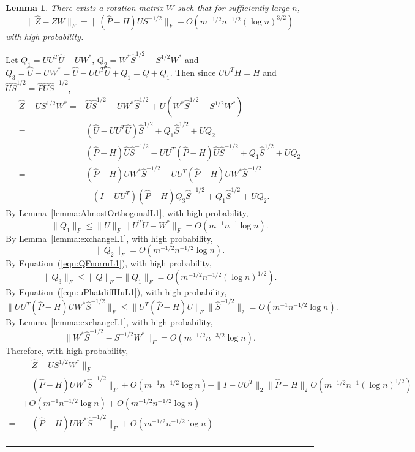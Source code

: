 \documentclass[a4paper]{article}
\newenvironment{proof}{{\bf Proof:  }}{\hfill\rule{2mm}{2mm}}
\newtheorem{lemma}[fact]{Lemma}
\renewcommand{\hat}{\widehat}
\begin{document}
\begin{lemma}
\label{lemma:XhatDiffXWexpressionL1}
There exists a rotation matrix $W$ such that for sufficiently large $n$,
\[
	\|\hat{Z} - Z W\|_F = \| (\hat{P} - H) U S^{-1/2} \|_F + O(m^{-1/2} n^{-1/2} (\log n)^{3/2})
\]
with high probability.
\end{lemma}
\begin{proof}
Let $Q_1 = U U^T \hat{U} - U W^*$, $Q_2 = W^* \hat{S}^{1/2} - S^{1/2} W^*$ and $Q_3 = \hat{U} - U W^* = \hat{U} - U U^T \hat{U} + Q_1 = Q + Q_1$. Then since $U U^T H = H$ and $\hat{U} \hat{S}^{1/2} = \hat{P} \hat{U} \hat{S}^{-1/2}$,
\begin{align*}
	\hat{Z} - U S^{1/2} W^*
    = & \hat{U} \hat{S}^{1/2} - U W^* \hat{S}^{1/2} + U(W^* \hat{S}^{1/2} - S^{1/2} W^*) \\
    = & (\hat{U} - U U^T \hat{U}) \hat{S}^{1/2} + Q_1 \hat{S}^{1/2} + U Q_2 \\
    = & (\hat{P} - H) \hat{U} \hat{S}^{-1/2} - U U^T(\hat{P} - H)\hat{U}\hat{S}^{-1/2} + Q_1 \hat{S}^{1/2} + U Q_2 \\
    = & (\hat{P} - H) U W^* \hat{S}^{-1/2} - U U^T(\hat{P} - H)U W^*\hat{S}^{-1/2} \\
    & + (I - U U^T)(\hat{P} - H) Q_3 \hat{S}^{-1/2} + Q_1 \hat{S}^{1/2} + U Q_2.
\end{align*}
By Lemma~\ref{lemma:AlmostOrthogonalL1}, with high probability, 
\[
	\|Q_1\|_F \le \| U\|_F \| U^T \hat{U} - W^* \|_F = O(m^{-1} n^{-1} \log n).
\]
By Lemma~\ref{lemma:exchangeL1}, with high probability, 
\[
	\|Q_2\|_F = O(m^{-1/2} n^{-1/2} \log n).
\]
By Equation~(\ref{eqn:QFnormL1}), with high probability, 
\[
	\|Q_3\|_F \le \|Q\|_F + \|Q_1\|_F = O(m^{-1/2} n^{-1/2} (\log n)^{1/2}).
\]
By Equation~(\ref{eqn:uPhatdiffHuL1}), with high probability, 
\[
	\| U U^T(\hat{P} - H)U W^*\hat{S}^{-1/2} \|_F
    \le \| U^T(\hat{P} - H)U \|_F \| \hat{S}^{-1/2} \|_2
    = O(m^{-1} n^{-1/2} \log n).
\]
By Lemma~\ref{lemma:exchangeL1}, with high probability, 
\[
	\| W^* \hat{S}^{-1/2} - S^{-1/2} W^* \|_F = O(m^{-1/2} n^{-3/2} \log n).
\]
Therefore, with high probability, 
\begin{align*}
	& \| \hat{Z} - U S^{1/2} W^* \|_F \\
    = & \| (\hat{P} - H) U W^* \hat{S}^{-1/2} \|_F + O(m^{-1} n^{-1/2} \log n)
    + \|I - U U^T \|_2 \| \hat{P} - H \|_2 O(m^{-1/2} n^{-1} (\log n)^{1/2}) \\
    & + O(m^{-1} n^{-1/2} \log n) + O(m^{-1/2} n^{-1/2} \log n)\\
    = & \| (\hat{P} - H) U W^* \hat{S}^{-1/2} \|_F + O(m^{-1/2} n^{-1/2} \log n) \\

\end{align*}
\end{proof}
\end{document}
